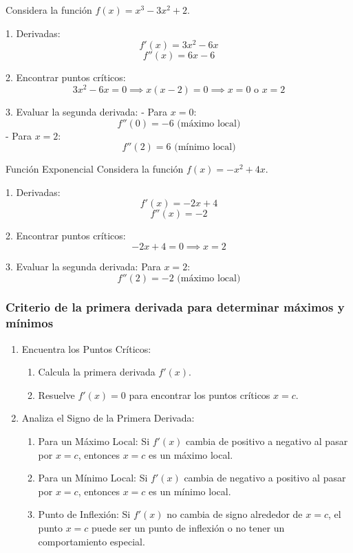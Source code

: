 \begin{example}
    Considera la función \( f(x) = x^3 - 3x^2 + 2 \).
    
    1. Derivadas:
       \[
       f'(x) = 3x^2 - 6x
       \]
       \[
       f''(x) = 6x - 6
       \]
    
    2. Encontrar puntos críticos:
       \[
       3x^2 - 6x = 0 \implies x(x - 2) = 0 \implies x = 0 \text{ o } x = 2
       \]
    
    3. Evaluar la segunda derivada:
       - Para \( x = 0 \):
         \[
         f''(0) = -6 \text{ (máximo local)}
         \]
       - Para \( x = 2 \):
         \[
         f''(2) = 6 \text{ (mínimo local)}
         \]
\end{example}


\begin{example}
Función Exponencial
Considera la función \( f(x) = -x^2 + 4x \).

1. Derivadas:
   \[
   f'(x) = -2x + 4
   \]
   \[
   f''(x) = -2
   \]

2. Encontrar puntos críticos:
   \[
   -2x + 4 = 0 \implies x = 2
   \]

3. Evaluar la segunda derivada:
   Para \( x = 2 \):
     \[
     f''(2) = -2 \text{ (máximo local)}
     \]

\end{example}


\subsubsection{Criterio de la primera derivada para determinar máximos y mínimos}

\begin{enumerate}
    \item Encuentra los Puntos Críticos:
    \begin{enumerate}
        \item Calcula la primera derivada \( f'(x) \).
        \item Resuelve \( f'(x) = 0 \) para encontrar los puntos críticos \( x = c \).
    \end{enumerate}
    \item Analiza el Signo de la Primera Derivada:
    \begin{enumerate}
        \item Para un Máximo Local: Si \( f'(x) \) cambia de positivo a negativo al pasar por \( x = c \), entonces \( x = c \) es un máximo local.
        \item Para un Mínimo Local: Si \( f'(x) \) cambia de negativo a positivo al pasar por \( x = c \), entonces \( x = c \) es un mínimo local.
        \item Punto de Inflexión: Si \( f'(x) \) no cambia de signo alrededor de \( x = c \), el punto \( x = c \) puede ser un punto de inflexión o no tener un comportamiento especial.
    \end{enumerate}
\end{enumerate}


